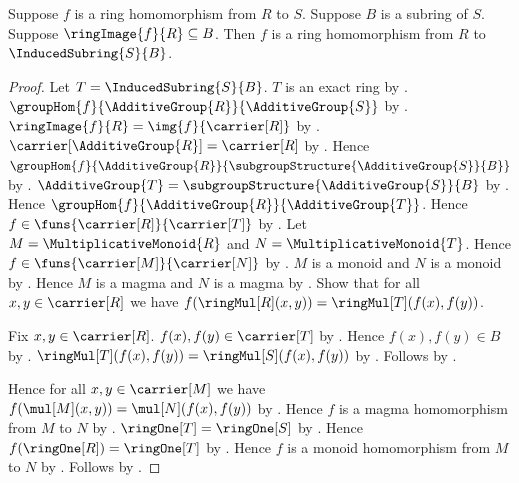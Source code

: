 \begin{theorem}\label{ring_hom_codomain_corestriction}
    Suppose $f$ is a ring homomorphism from $R$ to $S$.
    Suppose $B$ is a subring of $S$.
    Suppose $\ringImage{f}{R}\subseteq B$.
    Then $f$ is a ring homomorphism from $R$ to
        $\InducedSubring{S}{B}$.
\end{theorem}
\begin{proof}
    Let $T=\InducedSubring{S}{B}$.
    $T$ is an exact ring by .
    $\groupHom{f}{\AdditiveGroup{R}}{\AdditiveGroup{S}}$ by
        .
    $\ringImage{f}{R}=\img{f}{\carrier[R]}$ by
        .
    $\carrier[\AdditiveGroup{R}]=\carrier[R]$ by
        .
    Hence $\groupHom{f}{\AdditiveGroup{R}}{
        \subgroupStructure{\AdditiveGroup{S}}{B}}$ by
        .
    $\AdditiveGroup{T}
        =\subgroupStructure{\AdditiveGroup{S}}{B}$ by
        .
    Hence $\groupHom{f}{\AdditiveGroup{R}}{\AdditiveGroup{T}}$.
    Hence $f\in\funs{\carrier[R]}{\carrier[T]}$ by
        .
    Let $M=\MultiplicativeMonoid{R}$ and
        $N=\MultiplicativeMonoid{T}$.
    Hence $f\in\funs{\carrier[M]}{\carrier[N]}$ by
        .
    $M$ is a monoid and $N$ is a monoid by
        .
    Hence $M$ is a magma and $N$ is a magma by
        .
    Show that for all $x,y\in\carrier[R]$ we have
        $f(\ringMul[R](x,y))=\ringMul[T](f(x),f(y))$.
    \begin{subproof}
        Fix $x,y\in\carrier[R]$.
        $f(x),f(y)\in\carrier[T]$ by .
        Hence $f(x),f(y)\in B$ by
            .
        $\ringMul[T](f(x),f(y))=\ringMul[S](f(x),f(y))$ by
            .
        Follows by .
    \end{subproof}
    Hence for all $x,y\in\carrier[M]$ we have
        $f(\mul[M](x,y))=\mul[N](f(x),f(y))$ by
        .
    Hence $f$ is a magma homomorphism from $M$ to $N$ by
        .
    $\ringOne[T]=\ringOne[S]$ by .
    Hence $f(\ringOne[R])=\ringOne[T]$ by .
    Hence $f$ is a monoid homomorphism from $M$ to $N$ by
        .
    Follows by .
\end{proof}

